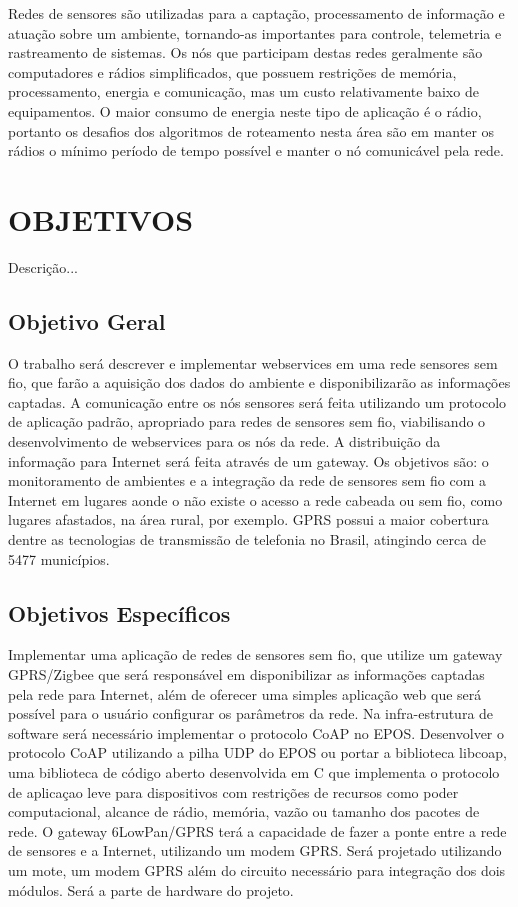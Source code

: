 Redes de sensores são utilizadas para a captação, processamento de informação e atuação sobre um ambiente, tornando-as importantes para controle, telemetria e rastreamento de sistemas.
Os n\'os que participam destas redes geralmente são computadores e r\'adios simplificados, que possuem restriç\~oes de mem\'oria, processamento, energia e comunicação, mas um custo relativamente baixo de equipamentos. O maior consumo de energia neste tipo de aplicação é o r\'adio, portanto os desafios dos algoritmos de roteamento nesta \'area são em manter os r\'adios o m\'inimo per\'iodo de tempo poss\'ivel e manter o n\'o comunic\'avel pela rede.

\section{OBJETIVOS}

Descrição...

\subsection{Objetivo Geral}

O trabalho ser\'a descrever e implementar webservices em uma rede sensores sem fio, que farão a aquisição dos dados do ambiente e disponibilizarão as informaç\~oes captadas. A comunicação entre os n\'os sensores ser\'a feita utilizando um protocolo de aplicação padrão, apropriado para redes de sensores sem fio, viabilisando o desenvolvimento de webservices para os n\'os da rede.
A distribuição da informação para Internet ser\'a feita através de um gateway. Os objetivos são: o monitoramento de ambientes e a integração da rede de sensores sem fio com a Internet em lugares aonde o não existe o acesso a rede cabeada ou sem fio, como lugares afastados, na \'area rural, por exemplo. GPRS possui a maior cobertura dentre as tecnologias de transmissão de telefonia no Brasil, atingindo cerca de 5477 munic\'ipios.


\subsection{Objetivos Espec\'ificos}

Implementar uma aplicação de redes de sensores sem fio, que utilize um gateway GPRS/Zigbee que ser\'a respons\'avel em disponibilizar as informaç\~oes captadas pela rede para Internet, além de oferecer uma simples aplicação web que ser\'a poss\'ivel para o usu\'ario configurar os par\^ametros da rede.
Na infra-estrutura de software ser\'a necess\'ario implementar o protocolo CoAP no EPOS. Desenvolver o protocolo CoAP utilizando a pilha UDP do EPOS ou portar a biblioteca libcoap, uma biblioteca de c\'odigo aberto desenvolvida em C que implementa o protocolo de aplicaçao leve para dispositivos com restriç\~oes de recursos como poder computacional, alcance de r\'adio, mem\'oria, vazão ou tamanho dos pacotes de rede.
O gateway 6LowPan/GPRS ter\'a a capacidade de fazer a ponte entre a rede de sensores e a Internet, utilizando um modem GPRS. Ser\'a projetado utilizando um mote, um modem GPRS além do circuito necess\'ario para integração dos dois m\'odulos. Ser\'a a parte de hardware do projeto.
